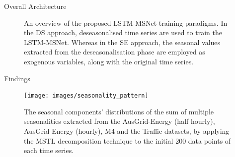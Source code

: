 \documentclass{beamer}
\begin{document}
\begin{frame}{Overall Architecture}
  	\begin{figure}[htp]
\vspace{4mm}
\caption{\tiny An overview of the proposed LSTM-MSNet training paradigms. In the DS approach, deseasonalised time series are used to train the LSTM-MSNet. Whereas in the SE approach, the seasonal values extracted from the deseasonalisation phase are employed as exogenous variables, along with the original time series.}
\label{lstm-schemes}
\end{figure}

\end{frame}

\begin{frame}{Findings}
  	\begin{figure}[htbp]
\centerline{\texttt{[image: images/seasonality\_pattern]}}
\caption{\tiny The seasonal components' distributions of the sum of multiple seasonalities extracted from the AusGrid-Energy (half hourly), AusGrid-Energy (hourly), M4 and the Traffic datasets, by applying the MSTL decomposition technique to the initial 200 data points of each time series.}
\label{seasonalpatterns}
\end{figure}
\end{frame}
%
\end{document}
